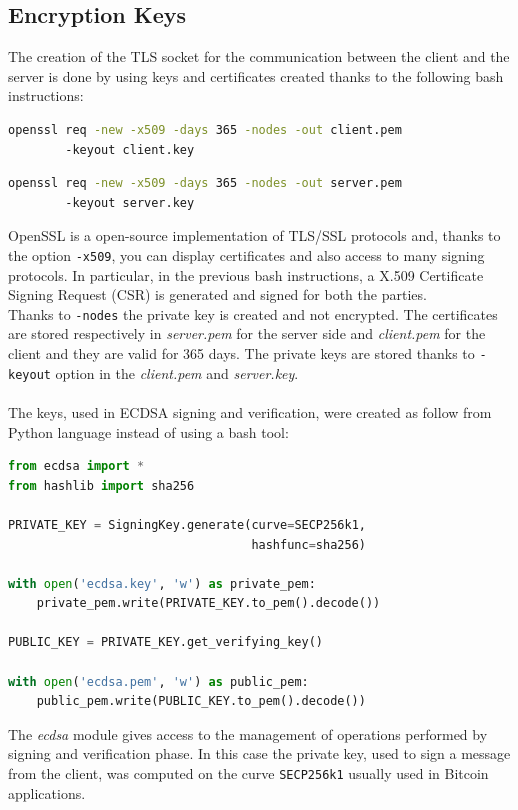 \subsection{Encryption Keys}
The creation of the TLS socket for the communication between the client and the server is done by using keys and certificates created thanks to the following bash instructions:
\vspace{0.3cm}
\begin{lstlisting}[language=bash, showstringspaces=false, tabsize=4]
openssl req -new -x509 -days 365 -nodes -out client.pem
		-keyout client.key
\end{lstlisting}
\begin{lstlisting}[language=bash, showstringspaces=false, tabsize=4]
openssl req -new -x509 -days 365 -nodes -out server.pem 
		-keyout server.key
\end{lstlisting}
OpenSSL is a open-source implementation of TLS/SSL protocols and, thanks to the option \texttt{-x509}, you can display certificates and also access to many signing protocols.
In particular, in the previous bash instructions, a X.509 Certificate Signing Request (CSR) is generated and signed for both the parties.\\
Thanks to \texttt{-nodes} the private key is created and not encrypted. The certificates are stored respectively in \textit{server.pem} for the server side and \textit{client.pem} for the client and they are valid for 365 days. The private keys are stored thanks to \texttt{-keyout} option in the \textit{client.pem} and \textit{server.key}.\\\\
The keys, used in ECDSA signing and verification, were created as follow from Python language instead of using a bash tool:
\vspace{0.3cm}
\begin{lstlisting}[language=python, showstringspaces=false, tabsize=4]
from ecdsa import *
from hashlib import sha256

PRIVATE_KEY = SigningKey.generate(curve=SECP256k1,
                                  hashfunc=sha256)

with open('ecdsa.key', 'w') as private_pem:
	private_pem.write(PRIVATE_KEY.to_pem().decode())

PUBLIC_KEY = PRIVATE_KEY.get_verifying_key()

with open('ecdsa.pem', 'w') as public_pem:
	public_pem.write(PUBLIC_KEY.to_pem().decode())
\end{lstlisting}
The \textit{ecdsa} module gives access to the management of operations performed by signing and verification phase. In this case the private key, used to sign a message from the client, was computed on the curve \texttt{SECP256k1} usually used in Bitcoin applications.